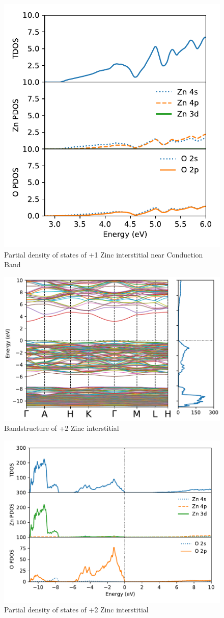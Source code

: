 \begin{figure}[tbh!]
	\centering
	\includegraphics[width=0.5\linewidth]{"images/rnd/dos-pdos-zoom_Zn_i-p1"}
	\caption[Partial density of states of +1 Zinc interstitial near Conduction Band]{Partial density of states of +1 Zinc interstitial near Conduction Band}
\end{figure}


\begin{figure}[tbh!]
	\centering
	\includegraphics[width=0.7\linewidth]{"images/rnd/band-dos_Zn_i-p2"}
	\caption[Bandstructure of +2 Zinc interstitial]{Bandstructure of +2 Zinc interstitial}
\end{figure}

\begin{figure}[tbh!]
	\centering
	\includegraphics[width=0.7\linewidth]{"images/rnd/dos-pdos_Zn_i-p2"}
	\caption[Partial density of states of +2 Zinc interstitial]{Partial density of states of +2 Zinc interstitial }
\end{figure}

